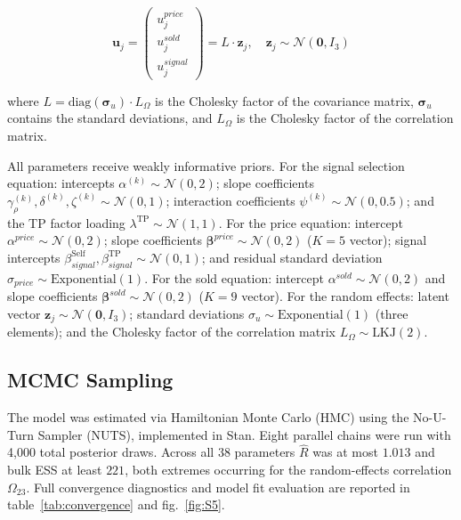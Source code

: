 \documentclass[11pt,letterpaper]{article}
\theoremstyle{definition}
\begin{document}
\begin{equation}
\mathbf{u}_j = \begin{pmatrix} u_j^{price} \\ u_j^{sold} \\ u_j^{signal} \end{pmatrix} = L \cdot \mathbf{z}_j, \quad \mathbf{z}_j \sim \mathcal{N}(\mathbf{0}, I_3) \label{eq:s8}
\end{equation}

where $L = \text{diag}(\boldsymbol{\sigma}_u) \cdot L_\Omega$ is the Cholesky factor of the covariance matrix, $\boldsymbol{\sigma}_u$ contains the standard deviations, and $L_\Omega$ is the Cholesky factor of the correlation matrix.

All parameters receive weakly informative priors. For the signal selection equation: intercepts $\alpha^{(k)} \sim \mathcal{N}(0, 2)$; slope coefficients $\gamma_\rho^{(k)}, \delta^{(k)}, \zeta^{(k)} \sim \mathcal{N}(0, 1)$; interaction coefficients $\psi^{(k)} \sim \mathcal{N}(0, 0.5)$; and the TP factor loading $\lambda^{\text{TP}} \sim \mathcal{N}(1, 1)$. For the price equation: intercept $\alpha^{price} \sim \mathcal{N}(0, 2)$; slope coefficients $\boldsymbol{\beta}^{price} \sim \mathcal{N}(0, 2)$ ($K = 5$ vector); signal intercepts $\beta_{signal}^{\text{Self}}, \beta_{signal}^{\text{TP}} \sim \mathcal{N}(0, 1)$; and residual standard deviation $\sigma_{price} \sim \text{Exponential}(1)$. For the sold equation: intercept $\alpha^{sold} \sim \mathcal{N}(0, 2)$ and slope coefficients $\boldsymbol{\beta}^{sold} \sim \mathcal{N}(0, 2)$ ($K = 9$ vector). For the random effects: latent vector $\mathbf{z}_j \sim \mathcal{N}(\mathbf{0}, I_3)$; standard deviations $\sigma_u \sim \text{Exponential}(1)$ (three elements); and the Cholesky factor of the correlation matrix $L_\Omega \sim \text{LKJ}(2)$.

\subsection{MCMC Sampling}\label{subsec:emp-D}

The model was estimated via Hamiltonian Monte Carlo (HMC) using the No-U-Turn Sampler (NUTS), implemented in Stan. Eight parallel chains were run with 4,000 total posterior draws. Across all 38 parameters $\hat{R}$ was at most $1.013$ and bulk ESS at least $221$, both extremes occurring for the random-effects correlation $\Omega_{23}$. Full convergence diagnostics and model fit evaluation are reported in table~\ref{tab:convergence} and fig.~\ref{fig:S5}.
\end{document}
